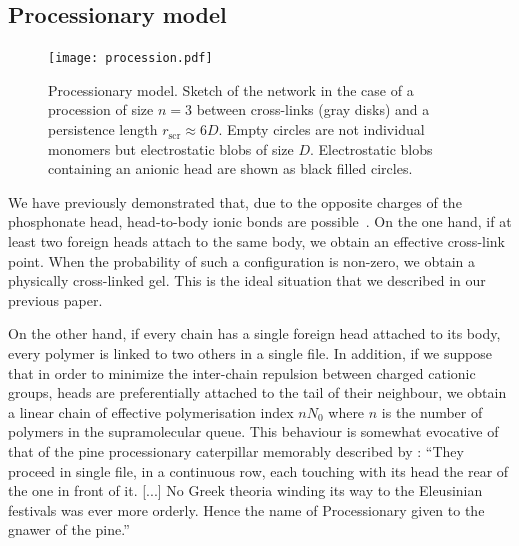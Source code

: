 \documentclass[journal=jacsat,manuscript=article]{achemso}
\begin{document}

\subsection{Processionary model}

\begin{figure}
\texttt{[image: procession.pdf]}
\caption{Processionary model. Sketch of the network in the case of a procession of size $n=3$ between cross-links (gray disks) and a persistence length $r_\mathrm{scr}\approx 6D$. Empty circles are not individual monomers but electrostatic blobs of size $D$. Electrostatic blobs containing an anionic head are shown as black filled circles.}
\label{fig:dissociation}
\end{figure}

We have previously demonstrated that, due to the opposite charges of the phosphonate head, head-to-body ionic bonds are possible~\cite{Srour2014}. On the one hand, if at least two foreign heads attach to the same body, we obtain an effective cross-link point. When the probability of such a configuration is non-zero, we obtain a physically cross-linked gel. This is the ideal situation that we described in our previous paper.

On the other hand, if every chain has a single foreign head attached to its body, every polymer is linked to two others in a single file. In addition, if we suppose that in order to minimize the inter-chain repulsion between charged cationic groups, heads are preferentially attached to the tail of their neighbour, we obtain a linear chain of effective polymerisation index $n N_0$ where $n$ is the number of polymers in the supramolecular queue. This behaviour is somewhat evocative of that of the pine processionary caterpillar memorably described by \citet{Fabre1916}: 
``They proceed in single file, in a continuous row, each touching with its head the rear of the one in front of it. [...] No Greek theoria winding its way to the Eleusinian festivals was ever more orderly. Hence the name of Processionary given to the gnawer of the pine.''
\end{document}

